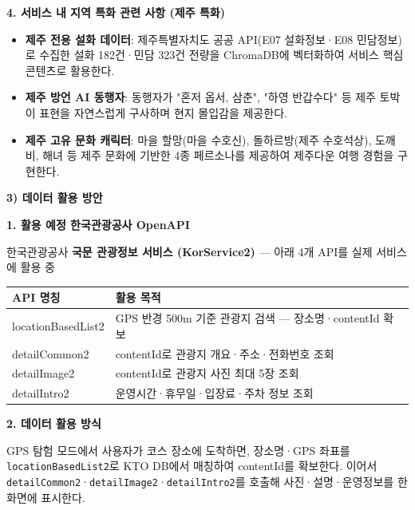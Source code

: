 \documentclass[12pt,a4paper]{article}
\newcommand{\sectionheadersimple}[1]{%
  \vspace{3mm}%
  \noindent\colorbox{sectiongray}{%
    \parbox{\dimexpr\textwidth-2\fboxsep\relax}{%
      \vspace{3pt}%
      \textbf{#1}%
      \vspace{3pt}%
    }%
  }%
  \vspace{2mm}%
}
\begin{document}
\vspace{2mm}
\textbf{4. 서비스 내 지역 특화 관련 사항 (제주 특화)}

\begin{itemize}
  \item \textbf{제주 전용 설화 데이터}: 제주특별자치도 공공 API(E07 설화정보·E08 민담정보)로 수집한 설화 182건·민담 323건 전량을 ChromaDB에 벡터화하여 서비스 핵심 콘텐츠로 활용한다.
  \item \textbf{제주 방언 AI 동행자}: 동행자가 "혼저 옵서, 삼춘", "하영 반갑수다" 등 제주 토박이 표현을 자연스럽게 구사하며 현지 몰입감을 제공한다.
  \item \textbf{제주 고유 문화 캐릭터}: 마을 할망(마을 수호신), 돌하르방(제주 수호석상), 도깨비, 해녀 등 제주 문화에 기반한 4종 페르소나를 제공하여 제주다운 여행 경험을 구현한다.
\end{itemize}

\vspace{2mm}

\sectionheadersimple{3) 데이터 활용 방안 \quad {\normalfont\small *한국관광공사 OpenAPI 활용 필수}}

\textbf{1. 활용 예정 한국관광공사 OpenAPI}

한국관광공사 \textbf{국문 관광정보 서비스 (KorService2)} — 아래 4개 API를 실제 서비스에 활용 중

\begin{center}
\begin{tabular}{|p{4.8cm}|p{8.5cm}|}
\hline
\rowcolor{lightgray}
\textbf{API 명칭} & \textbf{활용 목적} \\
\hline
locationBasedList2 & GPS 반경 500m 기준 관광지 검색 — 장소명·contentId 확보 \\
\hline
detailCommon2 & contentId로 관광지 개요·주소·전화번호 조회 \\
\hline
detailImage2 & contentId로 관광지 사진 최대 5장 조회 \\
\hline
detailIntro2 & 운영시간·휴무일·입장료·주차 정보 조회 \\
\hline
\end{tabular}
\end{center}

\vspace{2mm}
\textbf{2. 데이터 활용 방식}

GPS 탐험 모드에서 사용자가 코스 장소에 도착하면, 장소명·GPS 좌표를 \texttt{locationBasedList2}로 KTO DB에서 매칭하여 contentId를 확보한다. 이어서 \texttt{detailCommon2}·\texttt{detailImage2}·\texttt{detailIntro2}를 호출해 사진·설명·운영정보를 한 화면에 표시한다.
\end{document}
